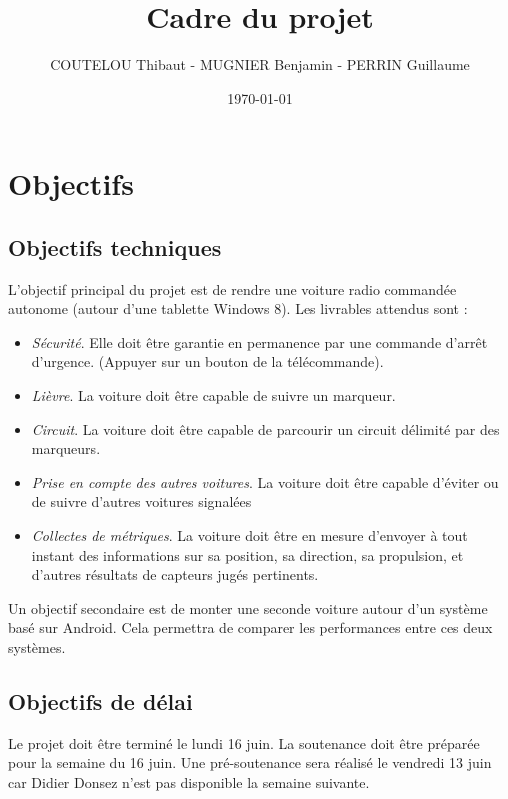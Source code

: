 \documentclass[a4paper,12pt]{article}
\title{Cadre du projet}
\author{COUTELOU Thibaut - MUGNIER Benjamin - PERRIN Guillaume}
\date{\today}
\begin{document}
\maketitle


\section{Objectifs}

\subsection{Objectifs techniques}

L'objectif principal du projet est de rendre une voiture radio commandée
autonome (autour d'une tablette Windows 8). Les livrables attendus sont :
\begin{itemize}
    \item \emph{Sécurité}. Elle doit être garantie en permanence par une commande d'arrêt
d'urgence. (Appuyer sur un bouton de la télécommande).
    \item \emph{Lièvre}. La voiture doit être capable de suivre un marqueur.
    \item \emph{Circuit}. La voiture doit être capable de parcourir un circuit délimité par des
        marqueurs.
    \item \emph{Prise en compte des autres voitures}. La voiture doit être
        capable d'éviter ou de suivre d'autres voitures signalées
    \item \emph{Collectes de métriques}. La voiture doit être en mesure d'envoyer à tout instant
        des informations sur sa position, sa direction, sa propulsion, et d'autres
        résultats de capteurs jugés pertinents.
\end{itemize}

Un objectif secondaire est de monter une seconde voiture autour d'un système
basé sur Android.
Cela permettra de comparer les performances entre ces deux systèmes.

\subsection{Objectifs de délai}

Le projet doit être terminé le lundi 16 juin.
La soutenance doit être préparée pour la semaine du 16 juin.
Une pré-soutenance sera réalisé le vendredi 13 juin car Didier
Donsez n'est pas disponible la semaine suivante.
\end{document}
